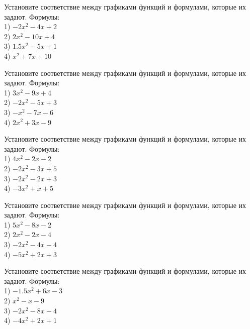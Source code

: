 \documentclass[4apaper]{article}
\begin{document}
\begin{taskBN}{68}
Установите соответствие между графиками функций и формулами, которые их задают. Формулы: \\1) $-2x^2-4x+2$\\2) $2x^2-10x+4$\\3) $1.5x^2-5x+1$\\4) $x^2+7x+10$
\end{taskBN}

\begin{taskBN}{69}
Установите соответствие между графиками функций и формулами, которые их задают. Формулы: \\1) $3x^2-9x+4$\\2) $-2x^2-5x+3$\\3) $-x^2-7x-6$\\4) $2x^2+3x-9$
\end{taskBN}

\begin{taskBN}{70}
Установите соответствие между графиками функций и формулами, которые их задают. Формулы: \\1) $4x^2-2x-2$\\2) $-2x^2-3x+5$\\3) $-2x^2-2x+3$\\4) $-3x^2+x+5$
\end{taskBN}

\begin{taskBN}{71}
Установите соответствие между графиками функций и формулами, которые их задают. Формулы: \\1) $5x^2-8x-2$\\2) $2x^2-2x-4$\\3) $-2x^2-4x-4$\\4) $-5x^2+2x+3$
\end{taskBN}

\begin{taskBN}{72}
Установите соответствие между графиками функций и формулами, которые их задают. Формулы: \\1) $-1.5x^2+6x-3$\\2) $x^2-x-9$\\3) $-2x^2-8x-4$\\4) $-4x^2+2x+1$
\end{taskBN}
\end{document}
